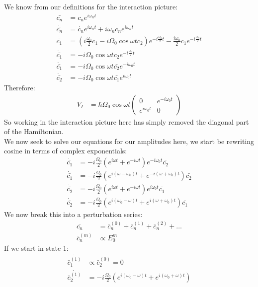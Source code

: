 We know from our definitions for the interaction picture:
\begin{align*}
	\bar{c_n} &= c_n e^{i\omega_n t} \\
	\dot{\bar{c_n}} &= \dot{c_n} e^{i\omega_n t} + i\omega_n c_n e^{i\omega_n t} \\
	\dot{\bar{c_1}} &= \left(i \frac{\omega_0}{2} c_1 - i\Omega_0\cos\omega t c_2 \right) e^{-i\frac{\omega_0}{2} t} -\frac{i\omega_0}{2}c_1 e^{-i\frac{\omega_0}{2} t} \\
	\dot{\bar{c_1}} &= - i\Omega_0\cos\omega t c_2  e^{-i\frac{\omega_0}{2} t} \\
	\dot{\bar{c_1}} &= -i\Omega_0\cos\omega t \bar{c_2}e^{-i\omega_0 t} \\
	\dot{\bar{c_2}} &= -i\Omega_0\cos\omega t \bar{c_1} e^{i\omega_0 t}
\end{align*}
Therefore:
\begin{align*}
	V_I &= \hbar \Omega_0 \cos\omega t \begin{pmatrix}
		0 & e^{-i\omega_0 t} \\
		e^{i\omega_0 t} & 0
		\end{pmatrix}
\end{align*}
So working in the interaction picture here has simply removed the diagonal part of the Hamiltonian. \\
We now seek to solve our equations for our amplitudes here, we start be rewriting cosine in terms of complex exponentials:
\begin{align*}
	\dot{\bar{c_1}} &= -i\frac{\Omega_0}{2}\left(e^{i\omega t} + e^{-i\omega t}\right)e^{-i\omega_0 t}\bar{c_2} \\
	\dot{\bar{c_1}} &= -i\frac{\Omega_0}{2}\left(e^{i(\omega-\omega_0) t} + e^{-i(\omega+\omega_0) t}\right)\bar{c_2} \\
	\dot{\bar{c_2}} &= -i\frac{\Omega_0}{2}\left(e^{i\omega t} + e^{-i\omega t}\right)e^{i\omega_0 t}\bar{c_1} \\
	\dot{\bar{c_2}} &= -i\frac{\Omega_0}{2}\left(e^{i(\omega_0-\omega) t} + e^{i(\omega + \omega_0)t}\right)\bar{c_1}
\end{align*}
We now break this into a perturbation series:
\begin{align*}
	\bar{c_n} &= \bar{c}_n^{(0)} + \bar{c}_n^{(1)} +\bar{c}_n^{(2)} + \ldots \\
	\bar{c}_n^{(m)} &\propto E_0^m 
\end{align*}
If we start in state 1:
\begin{align*}
	\dot{\bar{c}_1^{(1)}} &\propto \bar{c}_2^{(0)} = 0 \\
	\dot{\bar{c}_2^{(1)}} &=-i\frac{\Omega_0}{2}\left(e^{i(\omega_0 - \omega) t} + e^{i(\omega_0 + \omega)t}\right)
\end{align*}
